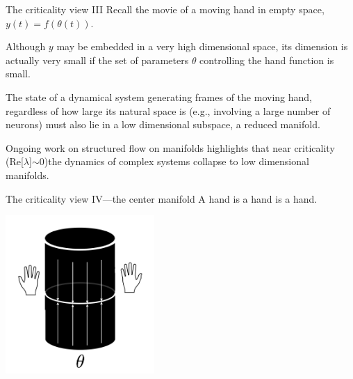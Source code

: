   \begin{frame}[label=ladila]{The criticality view III}
  Recall the movie of a moving hand in empty space, $y(t) = f(\theta(t))$. %
  \vfill
  
 Although $y$ may be embedded in a very high dimensional space, its dimension is actually very small if the set of parameters $\theta$ controlling the hand function is small.\vfill
  
The state of a dynamical system generating frames of the moving hand, regardless of how large its natural space is  (e.g., involving a large number of neurons) must also lie in a low dimensional subspace, a reduced manifold.  \vfill
  
   Ongoing work  on structured flow on manifolds \citep{Jirsa2020,Jirsa2022} highlights that near criticality (Re[$\lambda$]$\sim0$)the dynamics of complex systems collapse to low dimensional manifolds. 
   

\end{frame}

\begin{frame}[label=ladila]{The criticality view IV---the center manifold}
A hand is a hand is a hand. 
 \begin{center}
  \includegraphics[height=6cm]{img/cylinder.png}
  \end{center}


\end{frame}



